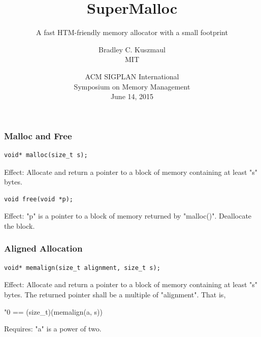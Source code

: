 \documentclass[xcolor=dvipsnames,14pt]{beamer}
\begin{document}
\title{SuperMalloc}
\subtitle{A fast HTM-friendly memory allocator with a small footprint}



\author{Bradley C. Kuszmaul \\ MIT}
\date{ACM SIGPLAN International \\ Symposium on Memory Management \\ June 14, 2015}
\frame{\titlepage}

\begin{frame}[fragile]
\frametitle{Malloc and Free}
\begin{verbatim}
void* malloc(size_t s);
\end{verbatim}

Effect: Allocate and return a pointer to a block of memory containing at least "s" bytes.

\begin{verbatim}
void free(void *p);
\end{verbatim}

Effect: "p" is a pointer to a block of memory returned by "malloc()".  Deallocate the block.
\end{frame}

\begin{frame}[fragile]
\frametitle{Aligned Allocation}

\begin{verbatim}
void* memalign(size_t alignment, size_t s);
\end{verbatim}


Effect: Allocate and return a pointer to a block of memory containing at least "s" bytes.  
The returned pointer shall be a multiple of "alignment".  That is,
\begin{center}
"0 == (size_t)(memalign(a, s)) %
\end{center}

Requires: "a" is a power of two.
\end{frame}

\newcommand{\zerobox}[1]{\parbox[b][0in][b]{0in}{#1}}
\end{document}
